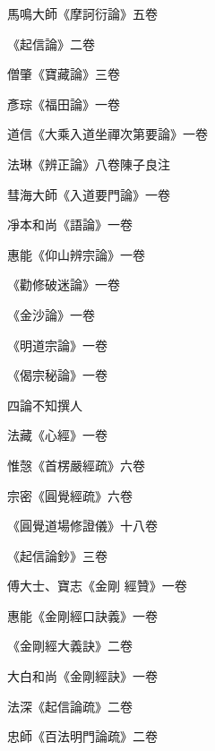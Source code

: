 \begin{pinyinscope}
 馬鳴大師《摩訶衍論》五卷



 《起信論》二卷



 僧肇《寶藏論》三卷



 彥琮《福田論》一卷



 道信《大乘入道坐禪次第要論》一卷



 法琳《辨正論》八卷陳子良注



 彗海大師《入道要門論》一卷



 凈本和尚《語論》一卷



 惠能《仰山辨宗論》一卷



 《勸修破迷論》一卷



 《金沙論》一卷



 《明道宗論》一卷



 《偈宗秘論》一卷



 四論不知撰人



 法藏《心經》一卷



 惟愨《首楞嚴經疏》六卷



 宗密《圓覺經疏》六卷



 《圓覺道場修證儀》十八卷



 《起信論鈔》三卷



 傅大士、寶志《金剛
 經贊》一卷



 惠能《金剛經口訣義》一卷



 《金剛經大義訣》二卷



 大白和尚《金剛經訣》一卷



 法深《起信論疏》二卷



 忠師《百法明門論疏》二卷




\end{pinyinscope}
